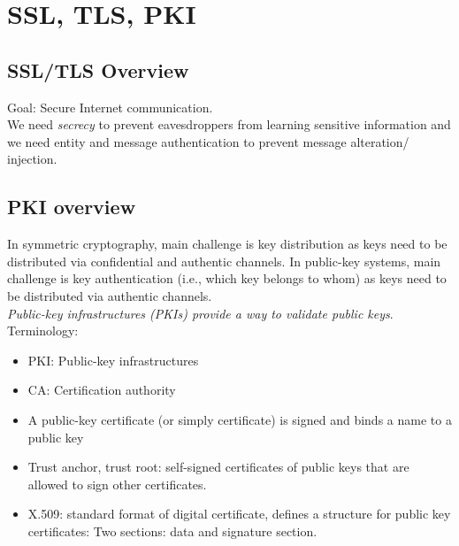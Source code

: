 \documentclass[11pt,oneside,a4paper]{article}
\begin{document}
\clearpage
\setcounter{tocdepth}{2}
\tableofcontents
\clearpage
{}


\newpage

\section{SSL, TLS, PKI}

\subsection{SSL/TLS Overview}

Goal: Secure Internet communication.\\
We need \textit{secrecy} to prevent eavesdroppers from learning sensitive information and we need entity and message authentication to prevent message alteration/ injection.

\subsection{PKI overview}

In symmetric cryptography, main challenge is key distribution as keys need to be distributed via confidential and authentic channels. In public-key systems, main challenge is key authentication (i.e., which key belongs to whom) as keys need to be distributed via authentic channels.\\
\textit{Public-key infrastructures (PKIs) provide a way to validate public keys}.\\

Terminology: 

\vspace{-\topsep}
\begin{itemize}
	\setlength{\itemsep}{0pt}
	\setlength{\parskip}{0pt}
	\item PKI: Public-key infrastructures
	\item CA: Certification authority
	\item A public-key certificate (or simply certificate) is signed and binds a name to a public key \item Trust anchor, trust root: self-signed certificates of public keys that are allowed to sign other certificates.
	\item X.509: standard format of digital certificate, defines a structure for public key certificates: Two sections: data and signature section.
\end{itemize}
\vspace{-\topsep}
\end{document}
